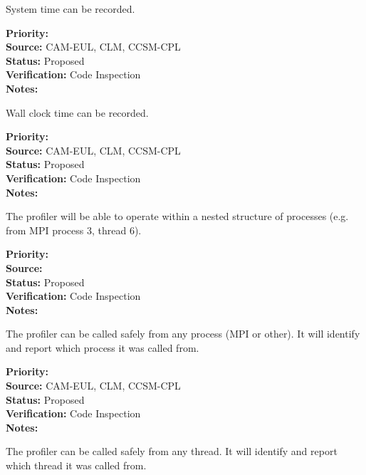 
System time can be recorded.

\begin{reqlist}
{\bf Priority:}  \\
{\bf Source:} CAM-EUL, CLM, CCSM-CPL \\
{\bf Status:} Proposed \\
{\bf Verification:} Code Inspection \\
{\bf Notes:} 
\end{reqlist}



Wall clock time can be recorded.

\begin{reqlist}
{\bf Priority:}  \\
{\bf Source:} CAM-EUL, CLM, CCSM-CPL \\
{\bf Status:} Proposed \\
{\bf Verification:} Code Inspection \\
{\bf Notes:} 
\end{reqlist}


The profiler will be able to operate within a nested structure of processes (e.g.
from MPI process 3, thread 6).

\begin{reqlist}
{\bf Priority:}  \\
{\bf Source:}  \\
{\bf Status:} Proposed \\
{\bf Verification:} Code Inspection \\
{\bf Notes:} 
\end{reqlist}


The profiler can be called safely from any process (MPI or other).  It will 
identify and report which process it was called from.

\begin{reqlist}
{\bf Priority:}  \\
{\bf Source:} CAM-EUL, CLM, CCSM-CPL \\
{\bf Status:} Proposed \\
{\bf Verification:} Code Inspection \\
{\bf Notes:} 
\end{reqlist}


The profiler can be called safely from any thread.  It will 
identify and report which thread it was called from.

